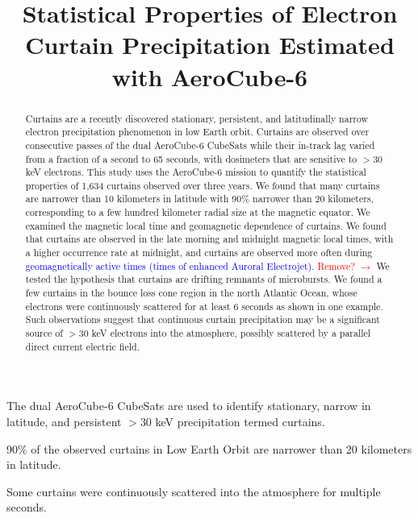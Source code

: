 \documentclass[draft]{agujournal2019}
\begin{document}
\title{Statistical Properties of Electron Curtain Precipitation Estimated with AeroCube-6}

%
%






\begin{keypoints}
\item The dual AeroCube-6 CubeSats are used to identify stationary, narrow in latitude, and persistent $>30$ keV precipitation termed curtains.
\item 90\% of the observed curtains in Low Earth Orbit are narrower than 20 kilometers in latitude.
\item Some curtains were continuously scattered into the atmosphere for multiple seconds.
\end{keypoints}


\begin{abstract}
Curtains are a recently discovered stationary, persistent, and latitudinally narrow electron precipitation phenomenon in low Earth orbit. Curtains are observed over consecutive passes of the dual AeroCube-6 CubeSats while their in-track lag varied from a fraction of a second to 65 seconds, with dosimeters that are sensitive to $> 30$ keV electrons. This study uses the AeroCube-6 mission to quantify the statistical properties of 1,634 curtains observed over three years. We found that many curtains are narrower than 10 kilometers in latitude with 90\% narrower than 20 kilometers, corresponding to a few hundred kilometer radial size at the magnetic equator. We examined the magnetic local time and geomagnetic dependence of curtains. We found that curtains are observed in the late morning and midnight magnetic local times, with a higher occurrence rate at midnight, and curtains are observed more often during \textcolor{blue}{geomagnetically active times (times of enhanced Auroral Electrojet)}. \textcolor{red}{Remove? $\rightarrow$} We tested the hypothesis that curtains are drifting remnants of microbursts. We found a few curtains in the bounce loss cone region in the north Atlantic Ocean, whose electrons were continuously scattered for at least 6 seconds as shown in one example. Such observations suggest that continuous curtain precipitation may be a significant source of $> 30$ keV electrons into the atmosphere, possibly scattered by a parallel direct current electric field.
\end{abstract}
\end{document}
